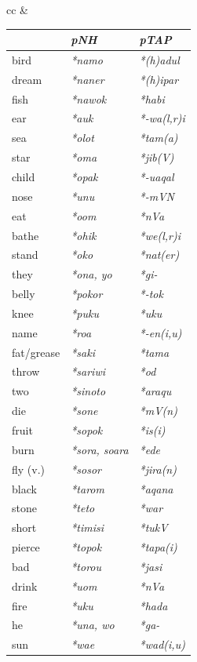 \begin{table}
\begin{tabular}{cc}
&

\begin{tabular}{l>{\it}l>{\it}l} 
 	& \rm  \textbf{pNH\ilt{proto-North-Halmahera}}	&  \rm \textbf{pTAP\ilt{proto-Timor Alor Pantar}}\\
    \midrule
bird	&  *namo	&  *(h)adul\\
dream	&  *naner{\ddag}	&  *(h)ipar\\
fish	&  *nawok	&  *habi\\
ear	&  *{\ng}auk	&  *-wa(l,r)i\\
sea	&  *{\ng}olot	&  *tam(a)\\
star	&  *{\ng}oma	&  *jib(V)\\
child	&  *{\ng}opak	&  *-uaqal\footnotemark{}\\
nose	&  *{\ng}unu{\ng}	&  *-mVN\\
eat	&  *o{\dDOT}om	&  *nVa\\
bathe	&  *ohik{\ddag}	&  *we(l,r)i\\
stand	&  *oko	&  *nat(er)\\
they	&  *ona, yo	&  *gi- {\ddag}\\
belly	&  *pokor	&  *-tok {\ddag}\\
knee	&  *puku	&  *uku {\ddag}\\
name	&  *ro{\ng}a	&  *-en(i,u) {\ddag}\\
fat/grease	&  *saki	&  *tama {\ddag}\\
throw	&  *sariwi	&  *od {\ddag}\\
two	&  *sinoto	&  *araqu {\ddag}\\
die 	&  *sone{\ng}	&  *mV(n)\\
fruit	&  *sopok	&  *is(i) {\ddag}\\
burn	&  *sora, so{\ng}ara	&  *ede {\ddag}\\
fly (v.)	&  *sosor	&  *jira(n) {\ddag}\\
black	&  *tarom	&  *aqana {\ddag}\\
stone	&  *teto	&  *war\\
short	&  *timisi	&  *tukV {\ddag}\\
pierce	&  *topok	&  *tapa(i)\\
bad	&  *torou	&  *jasi {\ddag}\\
drink	&  *u{\dDOT}om	&  *nVa\\
fire	&  *uku	&  *hada\\
he	&  *una, wo	&  *ga- {\ddag}\\
sun	&  *wa{\ng}e	&  *wad(i,u)\\
 
\end{tabular}
\\


\end{tabular}
\end{table}
